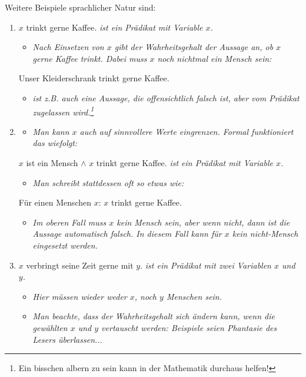 \begin{example}
    Weitere Beispiele sprachlicher Natur sind:
    \begin{enumerate}
        \item $x$ trinkt gerne Kaffee. \hfill \emph{ist ein Prädikat mit Variable $x$.}
        \begin{itemize}[label=]
            \item \emph{Nach Einsetzen von $x$ gibt der Wahrheitsgehalt der Aussage an, ob $x$ gerne Kaffee trinkt. Dabei muss $x$ noch nichtmal ein Mensch sein:}
        \end{itemize}
        
        Unser Kleiderschrank trinkt gerne Kaffee.
        \begin{itemize}[label=]
            \item \emph{ist z.B. auch eine Aussage, die offensichtlich falsch ist, aber vom Prädikat zugelassen wird.\footnote{Ein bisschen albern zu sein kann in der Mathematik durchaus helfen!}}
        \end{itemize}
        \item \begin{itemize}[label=]
            \item \emph{Man kann $x$ auch auf sinnvollere Werte eingrenzen. Formal funktioniert das wiefolgt:}
        \end{itemize}

        $x$ ist ein Mensch $\land$ $x$ trinkt gerne Kaffee. \hfill \emph{ist ein Prädikat mit Variable $x$.}
        \begin{itemize}[label=]
            \item \emph{Man schreibt stattdessen oft so etwas wie:}
        \end{itemize}

        Für einen Menschen $x$: $x$ trinkt gerne Kaffee.
        \begin{itemize}[label=]
            \item \emph{Im oberen Fall muss $x$ kein Mensch sein, aber wenn nicht, dann ist die Aussage automatisch falsch. In diesem Fall kann für $x$ kein nicht-Mensch eingesetzt werden.}
        \end{itemize}
        \item $x$ verbringt seine Zeit gerne mit $y$. \hfill \emph{ist ein Prädikat mit zwei Variablen $x$ und $y$.}
        \begin{itemize}[label=]
            \item \emph{Hier müssen wieder weder $x$, noch $y$ Menschen sein.}
            \item \emph{Man beachte, dass der Wahrheitsgehalt sich ändern kann, wenn die gewählten $x$ und $y$ vertauscht werden: Beispiele seien Phantasie des Lesers überlassen...}
        \end{itemize}
    \end{enumerate}
\end{example}

